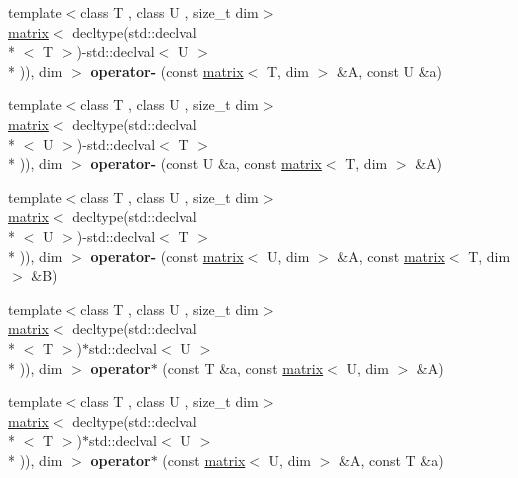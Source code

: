 \begin{DoxyCompactItemize}
\item 
\hypertarget{namespacekeycpp_a11495b995d042f380b75ab2a5c339c26}{{\footnotesize template$<$class T , class U , size\-\_\-t dim$>$ }\\\hyperlink{classkeycpp_1_1matrix}{matrix}$<$ decltype(std\-::declval\\*
$<$ T $>$)-\/std\-::declval$<$ U $>$\\*
)), dim $>$ {\bfseries operator-\/} (const \hyperlink{classkeycpp_1_1matrix}{matrix}$<$ T, dim $>$ \&A, const U \&a)}\label{namespacekeycpp_a11495b995d042f380b75ab2a5c339c26}

\item 
\hypertarget{namespacekeycpp_ab49d5c8906947568614956968251f5d8}{{\footnotesize template$<$class T , class U , size\-\_\-t dim$>$ }\\\hyperlink{classkeycpp_1_1matrix}{matrix}$<$ decltype(std\-::declval\\*
$<$ U $>$)-\/std\-::declval$<$ T $>$\\*
)), dim $>$ {\bfseries operator-\/} (const U \&a, const \hyperlink{classkeycpp_1_1matrix}{matrix}$<$ T, dim $>$ \&A)}\label{namespacekeycpp_ab49d5c8906947568614956968251f5d8}

\item 
\hypertarget{namespacekeycpp_a0e7c18c3754a5fde2652aa67964adf19}{{\footnotesize template$<$class T , class U , size\-\_\-t dim$>$ }\\\hyperlink{classkeycpp_1_1matrix}{matrix}$<$ decltype(std\-::declval\\*
$<$ U $>$)-\/std\-::declval$<$ T $>$\\*
)), dim $>$ {\bfseries operator-\/} (const \hyperlink{classkeycpp_1_1matrix}{matrix}$<$ U, dim $>$ \&A, const \hyperlink{classkeycpp_1_1matrix}{matrix}$<$ T, dim $>$ \&B)}\label{namespacekeycpp_a0e7c18c3754a5fde2652aa67964adf19}

\item 
\hypertarget{namespacekeycpp_a0fb730e3fdb0eb44a13913518ce0afc1}{{\footnotesize template$<$class T , class U , size\-\_\-t dim$>$ }\\\hyperlink{classkeycpp_1_1matrix}{matrix}$<$ decltype(std\-::declval\\*
$<$ T $>$)$\ast$std\-::declval$<$ U $>$\\*
)), dim $>$ {\bfseries operator$\ast$} (const T \&a, const \hyperlink{classkeycpp_1_1matrix}{matrix}$<$ U, dim $>$ \&A)}\label{namespacekeycpp_a0fb730e3fdb0eb44a13913518ce0afc1}

\item 
\hypertarget{namespacekeycpp_a650b89b71e7516e560bb2be49b30aedd}{{\footnotesize template$<$class T , class U , size\-\_\-t dim$>$ }\\\hyperlink{classkeycpp_1_1matrix}{matrix}$<$ decltype(std\-::declval\\*
$<$ T $>$)$\ast$std\-::declval$<$ U $>$\\*
)), dim $>$ {\bfseries operator$\ast$} (const \hyperlink{classkeycpp_1_1matrix}{matrix}$<$ U, dim $>$ \&A, const T \&a)}\label{namespacekeycpp_a650b89b71e7516e560bb2be49b30aedd}


\end{DoxyCompactItemize}
